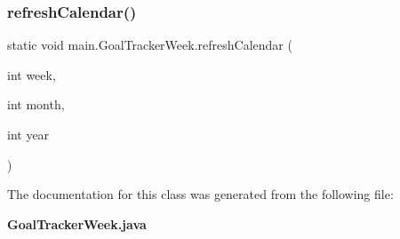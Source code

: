 \subsubsection{refresh\+Calendar()}
{\footnotesize\ttfamily static void main.\+Goal\+Tracker\+Week.\+refresh\+Calendar (\begin{DoxyParamCaption}\item[{int}]{week,  }\item[{int}]{month,  }\item[{int}]{year }\end{DoxyParamCaption})\hspace{0.3cm}{\ttfamily [static]}}



The documentation for this class was generated from the following file\+:\begin{DoxyCompactItemize}
\item 
\textbf{ Goal\+Tracker\+Week.\+java}\end{DoxyCompactItemize}
